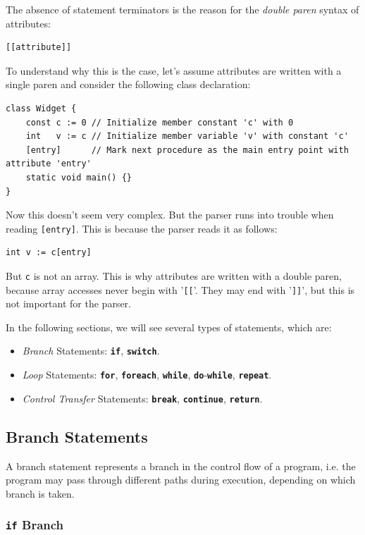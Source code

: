 \documentclass[a5paper]{report}
\begin{document}
The absence of statement terminators is the reason for the \textit{double paren} syntax of attributes:
\begin{lstlisting}
[[attribute]]
\end{lstlisting}
To understand why this is the case, let's assume attributes are written with a single paren and consider
the following class declaration:
\begin{lstlisting}
class Widget {
    const c := 0 // Initialize member constant 'c' with 0
    int   v := c // Initialize member variable 'v' with constant 'c'
    [entry]      // Mark next procedure as the main entry point with attribute 'entry'
    static void main() {}
}
\end{lstlisting}
Now this doesn't seem very complex. But the parser runs into trouble when reading \texttt{[entry]}.
This is because the parser reads it as follows:
\begin{lstlisting}
int v := c[entry]
\end{lstlisting}
But \texttt{c} is not an array. This is why attributes are written with a double paren, because array accesses
never begin with '\texttt{[[}'. They may end with '\texttt{]]}', but this is not important for the parser.

In the following sections, we will see several types of statements, which are:
\begin{itemize}
	\item \textit{Branch} Statements:
		\textbf{\texttt{if}}, \textbf{\texttt{switch}}.
	\item \textit{Loop} Statements:
		\textbf{\texttt{for}}, \textbf{\texttt{foreach}}, \textbf{\texttt{while}},
		\textbf{\texttt{do}}-\textbf{\texttt{while}}, \textbf{\texttt{repeat}}.
	\item \textit{Control Transfer} Statements:
		\textbf{\texttt{break}}, \textbf{\texttt{continue}}, \textbf{\texttt{return}}.
\end{itemize}

\subsection{Branch Statements}

A branch statement represents a branch in the control flow of a program, i.e. the program may pass through different
paths during execution, depending on which branch is taken.

\subsubsection{\texttt{if} Branch}
\end{document}
